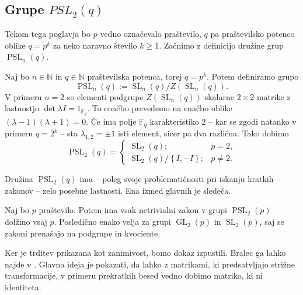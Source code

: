 \subsection{Grupe $PSL_2(q)$}\label{sec_grupe_psl2q}

Tekom tega poglavja bo $p$ vedno označevalo praštevilo, $q$ pa praštevilsko potenco oblike $q = p^{k}$ za neko naravno število $k \ge $1. Začnimo z definicijo družine grup $\operatorname{PSL}_n(q)$.

\begin{definicija}\label{def_pslnq_in_psl2q}
    Naj bo $n \in \mathbb{N}$ in $q \in \mathbb{N}$ praštevilska potenca, torej $q = p^{k}$. Potem definiramo grupo \begin{equation*}
        \operatorname{PSL}_n(q) := {\operatorname{SL}_n(q)} / {Z(\operatorname{SL}_n(q))}.
     \end{equation*}   
    V primeru $n = 2$ so elementi podgrupe $Z(\operatorname{SL}_n(q))$ skalarne $2 \times 2$ matrike z lastnostjo $\det \lambda I = 1_{\mathbb{F}_q}$. To enačbo prevedemo na enačbo oblike $(\lambda - 1)(\lambda + 1) = 0$.
    Če ima polje $\mathbb{F}_q$ karakteristiko $2$ -- kar se zgodi natanko v primeru $q = 2^{k}$ -- sta $\lambda_{1,2} = \pm 1$ isti element, sicer pa dva različna. Tako dobimo
    \begin{equation*}
                \operatorname{PSL}_2(q) = \begin{cases}
                    \operatorname{SL}_2(q); & p = 2,  \\
                    {\operatorname{SL}_2(q)} / {\left\{ I, -I \right\} }; & p \neq 2.
                \end{cases}
             \end{equation*}   
    \end{definicija}
    
    Družina $\operatorname{PSL}_2(q)$ ima -- poleg svoje problematičnosti pri iskanju kratkih zakonov -- zelo posebne lastnosti. Ena izmed glavnih je sledeča. 
    \begin{trditev}\label{trd_dolzina_zakonov_za_psl2p}
    Naj bo $p$ praštevilo. Potem ima vsak netrivialni zakon v grupi $\operatorname{PSL}_2(p)$ dolžino vsaj $p$. Posledično enako velja za grupi $\operatorname{GL}_2(p)$ in $\operatorname{SL}_2(p)$,
    saj se zakoni prenašajo na podgrupe in kvociente.
    \end{trditev}
    \begin{dokaz}
        Ker je trditev prikazana kot zanimivost, bomo dokaz izpustili. Bralec ga lahko najde v \cite{Schneider_2016}. Glavna ideja je pokazati, da lahko z matrikami, ki predsatvljajo strižne transformacije,
        v primeru prekratkih besed vedno dobimo matriko, ki ni identiteta. %
        \end{dokaz}

